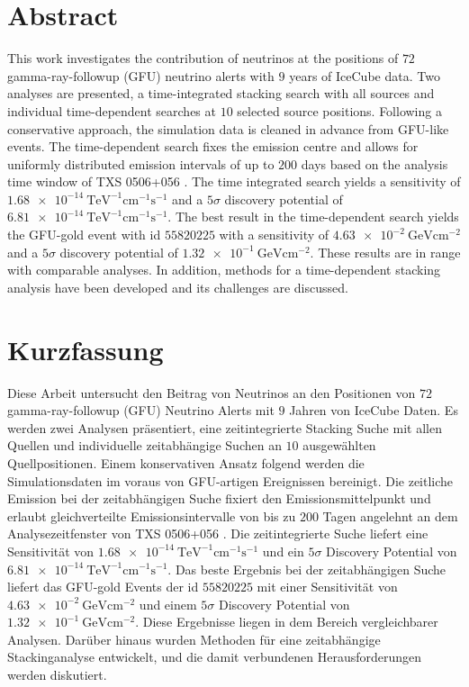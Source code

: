 \section*{Abstract}

This work investigates the contribution of neutrinos at the positions of $\num{72}$ gamma-ray-followup (GFU) neutrino alerts with $\num{9}$ years of IceCube data.
Two analyses are presented, a time-integrated stacking search with all sources and individual time-dependent searches at $\num{10}$ selected source positions.
Following a conservative approach, the simulation data is cleaned in advance from GFU-like events.
The time-dependent search fixes the emission centre and allows for uniformly distributed emission intervals of up to $\num{200}$ days based on the analysis time window of TXS 0506+056 \cite{_txs}.
The time integrated search yields a sensitivity of $\SI{1.68e-14}{\tera\electronvolt\tothe{-1}\centi\meter\tothe{-1}\second\tothe{-1}}$ and a $\num{5}\sigma$ discovery potential of $\SI{6.81e-14}{\tera\electronvolt\tothe{-1}\centi\meter\tothe{-1}\second\tothe{-1}}$.
The best result in the time-dependent search yields the GFU-gold event with id $\num{55820225}$ with a sensitivity of $\SI{4.63e-2}{\giga\electronvolt\centi\meter\tothe{-2}}$ and a $\num{5}\sigma$ discovery potential of $\SI{1.32e-1}{\giga\electronvolt\centi\meter\tothe{-2}}$.
These results are in range with comparable analyses.
In addition, methods for a time-dependent stacking analysis have been developed and its challenges are discussed.

\section*{Kurzfassung}

Diese Arbeit untersucht den Beitrag von Neutrinos an den Positionen von $\num{72}$ gamma-ray-followup (GFU) Neutrino Alerts mit $\num{9}$ Jahren von IceCube Daten.
Es werden zwei Analysen präsentiert, eine zeitintegrierte Stacking Suche mit allen Quellen und individuelle zeitabhängige Suchen an $\num{10}$ ausgewählten Quellpositionen.
Einem konservativen Ansatz folgend werden die Simulationsdaten im voraus von GFU-artigen Ereignissen bereinigt.
Die zeitliche Emission bei der zeitabhängigen Suche fixiert den Emissionsmittelpunkt und erlaubt gleichverteilte Emissionsintervalle von bis zu $\num{200}$ Tagen angelehnt an dem Analysezeitfenster von TXS 0506+056 \cite{_txs}.
Die zeitintegrierte Suche liefert eine Sensitivität von $\SI{1.68e-14}{\tera\electronvolt\tothe{-1}\centi\meter\tothe{-1}\second\tothe{-1}}$ und ein $\num{5}\sigma$ Discovery Potential von $\SI{6.81e-14}{\tera\electronvolt\tothe{-1}\centi\meter\tothe{-1}\second\tothe{-1}}$.
Das beste Ergebnis bei der zeitabhängigen Suche liefert das GFU-gold Events der id $\num{55820225}$ mit einer Sensitivität von $\SI{4.63e-2}{\giga\electronvolt\centi\meter\tothe{-2}}$ und einem $\num{5}\sigma$ Discovery Potential von $\SI{1.32e-1}{\giga\electronvolt\centi\meter\tothe{-2}}$.
Diese Ergebnisse liegen in dem Bereich vergleichbarer Analysen.
Darüber hinaus wurden Methoden für eine zeitabhängige Stackinganalyse entwickelt, und die damit verbundenen Herausforderungen werden diskutiert.
